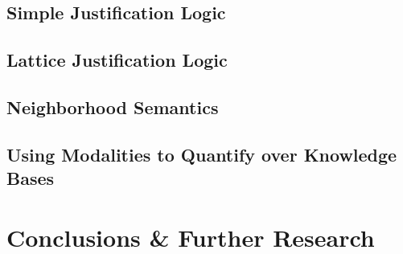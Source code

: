 \documentclass{article}
\begin{document}
\subsection{Simple Justification Logic}
\label{simple_justification}


\subsection{Lattice Justification Logic}
\label{lattice_justification}


\subsection{Neighborhood Semantics}
\label{neighborhood_semantics}


\subsection{\label{quantifying}Using Modalities to Quantify over Knowledge
Bases}
\label{modal-modal}


\section{Conclusions \& Further Research}
\label{conclusions}




\end{document}
